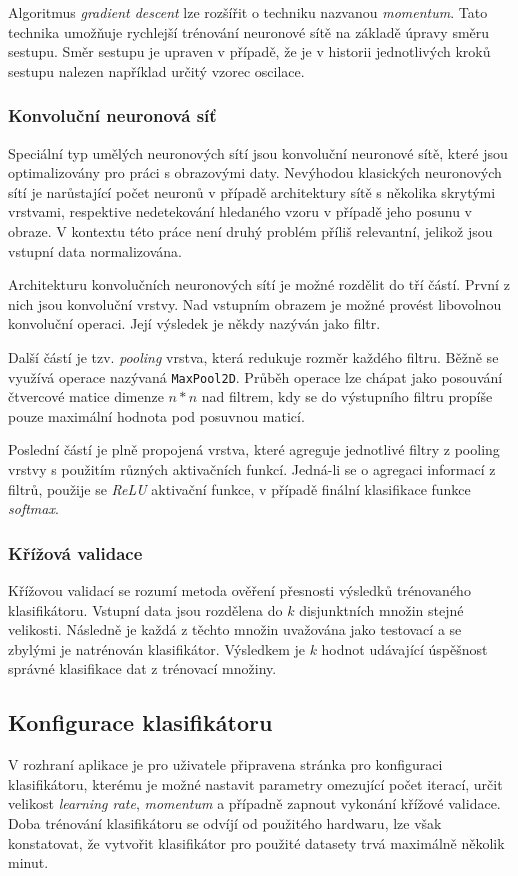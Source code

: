 \documentclass[
  field=ainfp,
  master=true,
  biblatex,
  sourcecodes=false,
  theorems=false,
  glossaries,
  index
]{kidiplom}
\begin{document}
Algoritmus \textit{gradient descent} lze rozšířit o techniku nazvanou \textit{momentum}. Tato technika umožňuje rychlejší trénování neuronové sítě na základě úpravy směru sestupu. Směr sestupu je upraven v případě, že je v historii jednotlivých kroků sestupu nalezen například určitý vzorec oscilace.


\subsubsection*{Konvoluční neuronová síť}
Speciální typ umělých neuronových sítí jsou konvoluční neuronové sítě, které jsou optimalizovány pro práci s obrazovými daty. Nevýhodou klasických neuronových sítí je narůstající počet neuronů v případě architektury sítě s několika skrytými vrstvami, respektive nedetekování hledaného vzoru v případě jeho posunu v obraze. V kontextu této práce není druhý problém příliš relevantní, jelikož jsou vstupní data normalizována.

Architekturu konvolučních neuronových sítí je možné rozdělit do tří částí. První z nich jsou konvoluční vrstvy. Nad vstupním obrazem je možné provést libovolnou konvoluční operaci. Její výsledek je někdy nazýván jako filtr.

Další částí je tzv. \textit{pooling} vrstva, která redukuje rozměr každého filtru. Běžně se využívá operace nazývaná \texttt{MaxPool2D}. Průběh operace lze chápat jako posouvání čtvercové matice dimenze $n*n$ nad filtrem, kdy se do výstupního filtru propíše pouze maximální hodnota pod posuvnou maticí.

Poslední částí je plně propojená vrstva, které agreguje jednotlivé filtry z pooling vrstvy s použitím různých aktivačních funkcí. Jedná-li se o agregaci informací z filtrů, použije se \textit{ReLU} aktivační funkce, v případě finální klasifikace funkce \textit{softmax}.

\subsubsection*{Křížová validace}
Křížovou validací se rozumí metoda ověření přesnosti výsledků trénovaného klasifikátoru. Vstupní data jsou rozdělena do $k$ disjunktních množin stejné velikosti. Následně je každá z těchto množin uvažována jako testovací a se zbylými je natrénován klasifikátor. Výsledkem je $k$ hodnot udávající úspěšnost správné klasifikace dat z trénovací množiny.

\subsection*{Konfigurace klasifikátoru}
V rozhraní aplikace je pro uživatele připravena stránka pro konfiguraci klasifikátoru, kterému je možné nastavit parametry omezující počet iterací, určit velikost \textit{learning rate}, \textit{momentum} a případně zapnout vyko\-nání křížové validace. Doba trénování klasifikátoru se odvíjí od použitého hardwaru, lze však konstatovat, že vytvořit klasifikátor pro použité datasety trvá maximálně několik minut.
\end{document}
